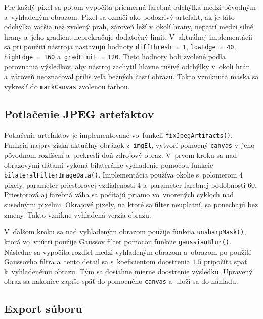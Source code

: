 Pre každý pixel sa potom vypočíta priemerná farebná odchýlka medzi pôvodným a~vyhladeným obrazom. Pixel sa označí ako podozrivý artefakt, ak je táto odchýlka väčšia než zvolený prah, zároveň leží v~okolí hrany, nepatrí medzi silné hrany a~jeho gradient neprekračuje dodatočný limit. V~aktuálnej implementácii sa pri použití nástroja nastavujú hodnoty \texttt{diffThresh = 1}, \texttt{lowEdge = 40}, \texttt{highEdge = 160} a~\texttt{gradLimit = 120}. Tieto hodnoty boli zvolené podľa porovnania výsledkov, aby nástroj zachytil hlavne rušivé odchýlky v~okolí hrán a~zároveň neoznačoval príliš veľa bežných častí obrazu. Takto vzniknutá maska sa vykreslí do \texttt{markCanvas} zvolenou farbou.

\subsection{Potlačenie JPEG artefaktov}

Potlačenie artefaktov je implementované vo~funkcii \texttt{fixJpegArtifacts()}. Funkcia najprv získa aktuálny obrázok z~\texttt{imgEl}, vytvorí pomocný \texttt{canvas} v~jeho pôvodnom rozlíšení a~prekreslí doň zdrojový obraz. V~prvom kroku sa nad obrazovými dátami vykoná bilaterálne vyhladenie pomocou funkcie \texttt{bilateralFilterImageData()}. Implementácia používa okolie s~polomerom \(4\) pixely, parameter priestorovej vzdialenosti \(4\) a~parameter farebnej podobnosti \(60\). Priestorová aj farebná váha sa počítajú priamo vo~vnorených cykloch nad susednými pixelmi. Okrajové pixely, na ktoré sa filter neuplatní, sa ponechajú bez zmeny. Takto vznikne vyhladená verzia obrazu.

V~ďalšom kroku sa nad vyhladeným obrazom použije funkcia \texttt{unsharpMask()}, ktorá vo~vnútri použije Gaussov filter pomocou funkcie \texttt{gaussianBlur()}. Následne sa vypočíta rozdiel medzi vyhladeným obrazom a~obrazom po použití Gaussovho filtra a~tento detail sa s~koeficientom doostrenia \(1.5\) pripočíta späť k~vyhladenému obrazu. Tým sa dosiahne mierne doostrenie výsledku. Upravený obraz sa nakoniec zapíše späť do pomocného \texttt{canvas} a~uloží sa do náhľadu.

\subsection{Export súboru}

